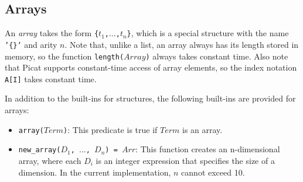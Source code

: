 \subsection{\label{subsec:arrays}Arrays}
An \emph{array} takes the form \texttt{\{$t_1$,$\ldots$,$t_{n}$\}}, which is a special structure with the name \texttt{'\{\}'} and arity $n$. Note that, unlike a list, an array always has its length stored in memory, so the function \texttt{length($Array$)} always takes constant time. Also note that Picat supports constant-time access of array elements, so the index notation \texttt{A[I]} takes constant time. 

In addition to the built-ins for structures, the following built-ins are provided for arrays:
\begin{itemize}
\item \texttt{array($Term$)}: This predicate is true if $Term$ is an array.
\item \texttt{new\_array($D_1$, $\ldots$, $D_n$) = $Arr$}: This function creates an n-dimensional array, where each $D_i$ is an integer expression that specifies the size of a dimension. In the current implementation, $n$ cannot exceed 10.
\end{itemize}

